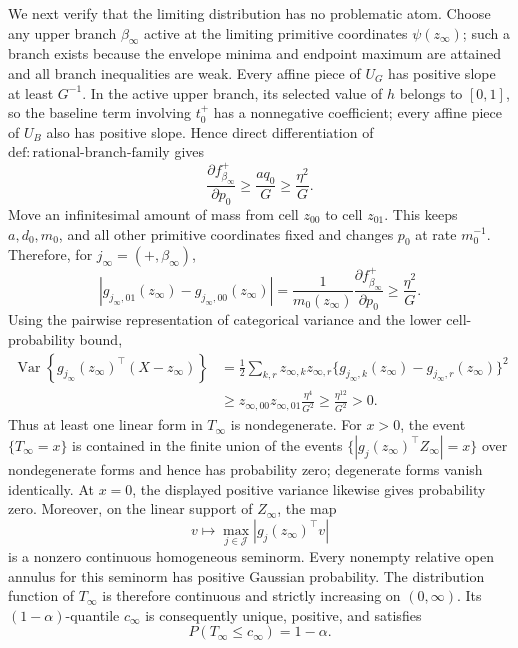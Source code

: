 We next verify that the limiting distribution has no problematic atom.  Choose any upper branch \(\beta_\infty\) active at the limiting primitive coordinates \(\psi(z_\infty)\); such a branch exists because the envelope minima and endpoint maximum are attained and all branch inequalities are weak.  Every affine piece of \(U_G\) has positive slope at least \(G^{-1}\).  In the active upper branch, its selected value of \(h\) belongs to \([0,1]\), so the baseline term involving \(t_0^+\) has a nonnegative coefficient; every affine piece of \(U_B\) also has positive slope.  Hence direct differentiation of \(\mathrm{def{:}rational\text{-}branch\text{-}family}\) gives
\[
 \frac{\partial f_{\beta_\infty}^+}{\partial p_0}
 \geq \frac{a q_0}{G}
 \geq\frac{\eta^2}{G}.
\]
Move an infinitesimal amount of mass from cell \(z_{00}\) to cell \(z_{01}\).  This keeps \(a,d_0,m_0\), and all other primitive coordinates fixed and changes \(p_0\) at rate \(m_0^{-1}\).  Therefore, for \(j_\infty=(+,\beta_\infty)\),
\[
 \left|g_{j_\infty,01}(z_\infty)-g_{j_\infty,00}(z_\infty)\right|
 =\frac1{m_0(z_\infty)}
 \frac{\partial f_{\beta_\infty}^+}{\partial p_0}
 \geq\frac{\eta^2}{G}.
\]
Using the pairwise representation of categorical variance and the lower cell-probability bound,
\[
 \begin{aligned}
 \operatorname{Var}\!\left\{
 g_{j_\infty}(z_\infty)^\top(X-z_\infty)
 \right\}
 &=\frac12\sum_{k,r}z_{\infty,k}z_{\infty,r}
 \{g_{j_\infty,k}(z_\infty)-g_{j_\infty,r}(z_\infty)\}^2\\
 &\geq z_{\infty,00}z_{\infty,01}\frac{\eta^4}{G^2}
 \geq\frac{\eta^{12}}{G^2}>0.
 \end{aligned}
\]
Thus at least one linear form in \(T_\infty\) is nondegenerate.  For \(x>0\), the event \(\{T_\infty=x\}\) is contained in the finite union of the events \(\{|g_j(z_\infty)^\top Z_\infty|=x\}\) over nondegenerate forms and hence has probability zero; degenerate forms vanish identically.  At \(x=0\), the displayed positive variance likewise gives probability zero.  Moreover, on the linear support of \(Z_\infty\), the map
\[
 v\longmapsto\max_{j\in\mathcal J}|g_j(z_\infty)^\top v|
\]
is a nonzero continuous homogeneous seminorm.  Every nonempty relative open annulus for this seminorm has positive Gaussian probability.  The distribution function of \(T_\infty\) is therefore continuous and strictly increasing on \((0,\infty)\).  Its \((1-\alpha)\)-quantile \(c_\infty\) is consequently unique, positive, and satisfies
\[
 P(T_\infty\leq c_\infty)=1-\alpha.
\]

